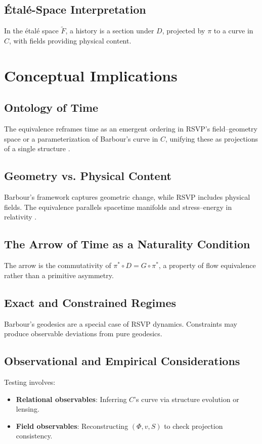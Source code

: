 \documentclass[11pt]{article}
\begin{document}
\subsection{Étalé-Space Interpretation}
In the étalé space $\tilde{F}$, a history is a section under $D$, projected by $\pi$ to a curve in $C$, with fields providing physical content.

\section{Conceptual Implications}

\subsection{Ontology of Time}
The equivalence reframes time as an emergent ordering in RSVP’s field–geometry space or a parameterization of Barbour’s curve in $C$, unifying these as projections of a single structure \citep{Rovelli2004}.

\subsection{Geometry vs. Physical Content}
Barbour’s framework captures geometric change, while RSVP includes physical fields. The equivalence parallels spacetime manifolds and stress–energy in relativity \citep{Einstein1915}.

\subsection{The Arrow of Time as a Naturality Condition}
The arrow is the commutativity of $\pi^* \circ D = G \circ \pi^*$, a property of flow equivalence rather than a primitive asymmetry.

\subsection{Exact and Constrained Regimes}
Barbour’s geodesics are a special case of RSVP dynamics. Constraints may produce observable deviations from pure geodesics.

\subsection{Observational and Empirical Considerations}
Testing involves:
\begin{itemize}
    \item \textbf{Relational observables}: Inferring $C$’s curve via structure evolution or lensing.
    \item \textbf{Field observables}: Reconstructing $(\Phi, v, S)$ to check projection consistency.
\end{itemize}
\end{document}
